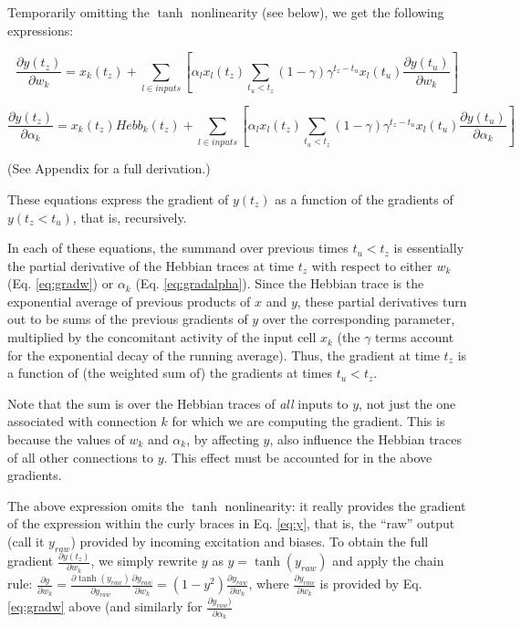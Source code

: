 \documentclass{article}
\begin{document}
Temporarily omitting the $\tanh$ nonlinearity (see below), we get the
following expressions: 

\begin{equation}
\label{eq:gradw}
\frac{\partial y(t_z)}{\partial w_k} = x_k(t_z) + \sum_{l \in inputs}[\alpha_l
x_l(t_z) \sum_{t_u<t_z}(1-\gamma) \gamma^{t_z-t_u} x_l(t_u) \frac{\partial
y(t_u)}{\partial w_k}]
\end{equation}

\begin{equation}
\label{eq:gradalpha}
\frac{\partial y(t_z)}{\partial \alpha_k} = x_k(t_z) Hebb_k(t_z) + \sum_{l \in inputs}
[\alpha_l x_l(t_z) \sum_{t_u<t_z}(1-\gamma) \gamma^{t_z-t_u} x_l(t_u) \frac{\partial
y(t_u)}{\partial \alpha_k}]
\end{equation}

(See Appendix for a full derivation.)

These equations express the gradient of $y(t_z)$ as a function of the gradients
of $y(t_z<t_u)$, that is, recursively.

In each of these equations, the summand over previous times $t_u<t_z$ is
essentially the partial derivative of the Hebbian traces at time $t_{z}$
with respect to either $w_k$ (Eq. \ref{eq:gradw}) or $\alpha_k$ (Eq.
\ref{eq:gradalpha}). Since the Hebbian trace is the exponential average of
previous products of $x$ and $y$, these partial derivatives turn out to be
sums of the previous gradients of $y$ over the corresponding parameter,
multiplied by the concomitant activity of the input cell $x_k$ (the $\gamma$ terms
account for the exponential decay of the running average). Thus, the gradient at
time $t_z$ is a function of (the weighted sum of) the gradients at times
$t_u<t_z$.

Note that the sum is over the Hebbian traces of \emph{all} inputs to $y$, not just the
one associated with connection $k$ for which we are computing the gradient. This is because the values of $w_k$ and
$\alpha_k$, by affecting $y$, also influence the Hebbian traces of all other
connections to $y$. This effect must be accounted for in the above gradients.

The above expression omits the $\tanh$ nonlinearity: it really provides the
gradient of the expression within the curly braces in Eq. \ref{eq:y}, that is,
the ``raw'' output (call it $y_{raw}$) provided by incoming excitation and biases. To obtain
the full gradient $\frac{\partial y(t_z)}{\partial w_k}$, we simply rewrite $y$ as $y =
\tanh(y_{raw})$ and apply the chain rule: $\frac{\partial y}{\partial w_k} =
\frac{\partial \tanh(y_{raw})}{\partial y_{raw}} \frac{\partial y_{raw}}{\partial
w_k} = (1 - y^2)\frac{\partial y_{raw}}{\partial w_k}$, where $\frac{\partial
y_{raw}}{\partial w_k}$ is provided by Eq. \ref{eq:gradw} above (and similarly
for $\frac{\partial
y_{raw})}{\partial \alpha_k}$ 
\end{document}
